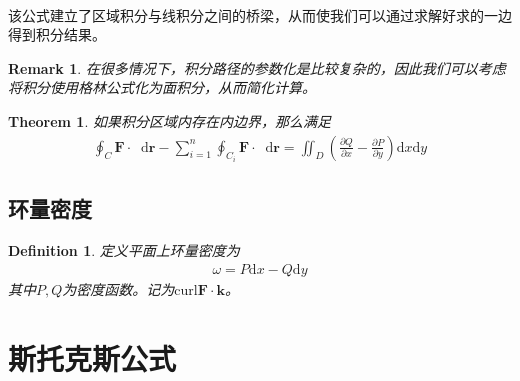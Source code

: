 \documentclass[12pt,a4paper,UTF8]{ctexbook}
\theoremstyle{plain}
\newtheorem{theorem}{\indent Theorem}[section]
\newtheorem{definition}{\indent Definition}[section]
\newtheorem{remark}{\indent Remark}[section]
\newcommand{\diff}{\mathop{}\!\mathrm{d}} %
\newcommand{\vb}[1]{\mathbf{#1}}          %
\begin{document}
\paragraph{}该公式建立了区域积分与线积分之间的桥梁，从而使我们可以通过求解好求的一边得到积分结果。
\begin{remark}
    在很多情况下，积分路径的参数化是比较复杂的，因此我们可以考虑将积分使用格林公式化为面积分，从而简化计算。
\end{remark}
\begin{theorem}
    如果积分区域内存在内边界，那么满足
    \begin{align*} 
        \oint_C \vb{F}\cdot \diff \vb{r} - \sum_{i = 1}^n \oint_{C_i} \vb{F}\cdot \diff \vb{r} = \iint_D (\frac{\partial Q}{\partial x}-\frac{\partial P}{\partial y})\mathrm d{x}\mathrm{d}y
    \end{align*}
\end{theorem}   
\subsection{环量密度}
\begin{definition}
    定义平面上环量密度为
    \begin{align*} 
        \omega = P\mathrm d x - Q\mathrm d y
    \end{align*} 
    其中$P,Q$为密度函数。记为$\mathrm{curl}\vb{F}\cdot  \vb{k}$。
\end{definition}
\section{斯托克斯公式}
\end{document}
